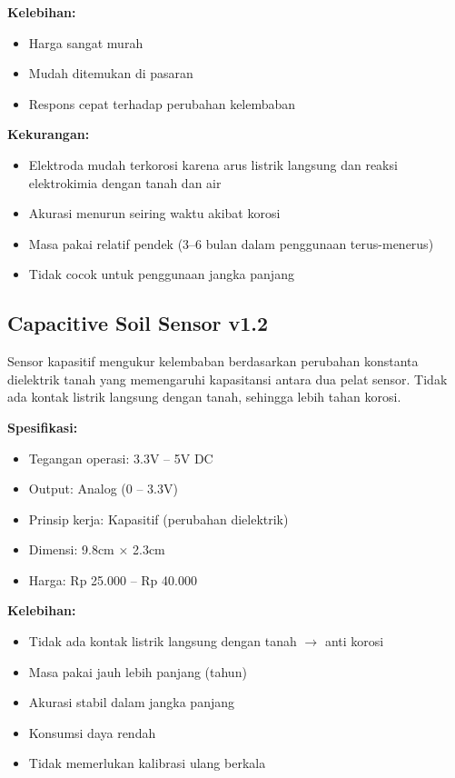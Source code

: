 \documentclass[12pt,a4paper,oneside]{report}
\begin{document}
\textbf{Kelebihan:}
\begin{itemize}
    \item Harga sangat murah
    \item Mudah ditemukan di pasaran
    \item Respons cepat terhadap perubahan kelembaban
\end{itemize}

\textbf{Kekurangan:}
\begin{itemize}
    \item Elektroda mudah terkorosi karena arus listrik langsung dan reaksi elektrokimia dengan tanah dan air
    \item Akurasi menurun seiring waktu akibat korosi
    \item Masa pakai relatif pendek (3--6 bulan dalam penggunaan terus-menerus)
    \item Tidak cocok untuk penggunaan jangka panjang
\end{itemize}

\subsection{Capacitive Soil Sensor v1.2}

Sensor kapasitif mengukur kelembaban berdasarkan perubahan konstanta dielektrik tanah yang memengaruhi kapasitansi antara dua pelat sensor. Tidak ada kontak listrik langsung dengan tanah, sehingga lebih tahan korosi.

\textbf{Spesifikasi:}
\begin{itemize}
    \item Tegangan operasi: 3.3V -- 5V DC
    \item Output: Analog (0 -- 3.3V)
    \item Prinsip kerja: Kapasitif (perubahan dielektrik)
    \item Dimensi: 9.8cm × 2.3cm
    \item Harga: Rp 25.000 -- Rp 40.000
\end{itemize}

\textbf{Kelebihan:}
\begin{itemize}
    \item Tidak ada kontak listrik langsung dengan tanah $\rightarrow$ anti korosi
    \item Masa pakai jauh lebih panjang (tahun)
    \item Akurasi stabil dalam jangka panjang
    \item Konsumsi daya rendah
    \item Tidak memerlukan kalibrasi ulang berkala
\end{itemize}
\end{document}

